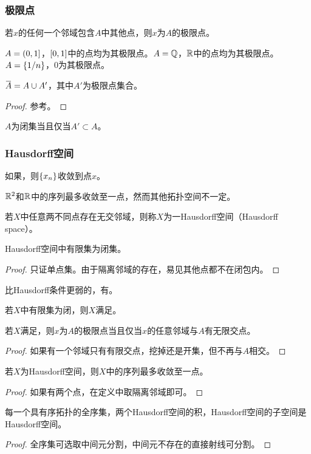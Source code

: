 \documentclass{ctexrep}
\begin{document}
  \subsubsection{极限点}
  \begin{definition}
    若$x$的任何一个邻域包含$A$中其他点，则$x$为$A$的极限点。
  \end{definition}
  \begin{ex}
    $A=\left(0,1\right]$，$\left[0,1\right]$中的点均为其极限点。$A=\mathbb{Q}$，$\mathbb{R}$中的点均为其极限点。$A=\left\{1/n\right\}$，$0$为其极限点。
  \end{ex}
  \begin{theorem}
  $\clo{A} = A\cup A'$，其中$A'$为极限点集合。
  \end{theorem}
  \begin{proof}
    参考。
  \end{proof}
  \begin{collary}
  $A$为闭集当且仅当$A'\subset A$。
  \end{collary}
  \subsubsection{Hausdorff空间}
  \begin{definition}
    如果，则$\left\{x_n\right\}$收敛到点$x$。
  \end{definition}
  $\mathbb{R}^2$和$\mathbb{R}$中的序列最多收敛至一点，然而其他拓扑空间不一定。
  \begin{definition}
    若$X$中任意两不同点存在无交邻域，则称$X$为一Hausdorff空间（Hausdorff space）。
  \end{definition}
  \begin{theorem}
    Hausdorff空间中有限集为闭集。
  \end{theorem}
  \begin{proof}
    只证单点集。由于隔离邻域的存在，易见其他点都不在闭包内。
  \end{proof}
  比Hausdorff条件更弱的，有\tuno 。
  \begin{definition}
    若$X$中有限集为闭，则$X$满足\tuno 。
  \end{definition}
  \begin{theorem}
    若$X$满足\tuno ，则$x$为$A$的极限点当且仅当$x$的任意邻域与$A$有无限交点。
  \end{theorem}
  \begin{proof}
    如果有一个邻域只有有限交点，挖掉还是开集，但不再与$A$相交。
  \end{proof}
  \begin{theorem}
    若$X$为Hausdorff空间，则$X$中的序列最多收敛至一点。
  \end{theorem}
  \begin{proof}
    如果有两个点，在定义中取隔离邻域即可。
  \end{proof}
  \begin{theorem}
  每一个具有序拓扑的全序集，两个Hausdorff空间的积，Hausdorff空间的子空间是Hausdorff空间。
  \end{theorem}
  \begin{proof}
    全序集可选取中间元分割，中间元不存在的直接射线可分割。
  \end{proof}
\end{document}
